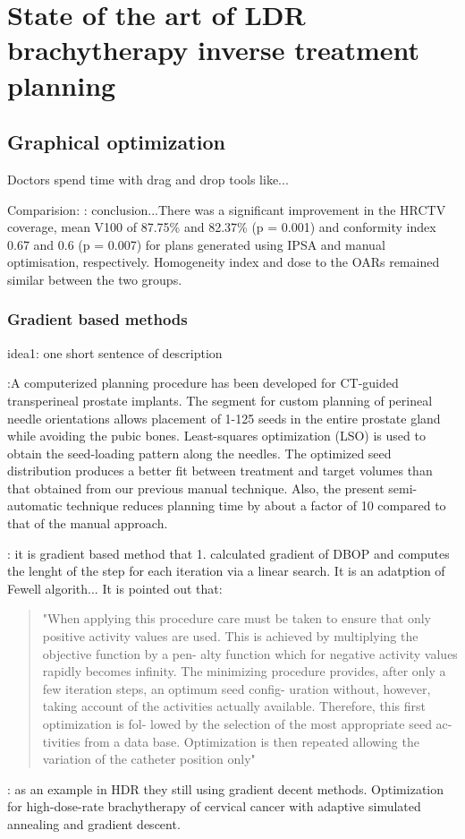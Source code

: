 \documentclass[12pt]{article}
\theoremstyle{definition}
\begin{document}
\section{State of the art of LDR brachytherapy inverse treatment planning}
\subsection{Graphical optimization}
Doctors spend time with drag and drop tools like...\par
Comparision: \cite{kannan2015comparison}: conclusion...There was a significant improvement in the HRCTV coverage, mean V100 of 87.75\% and 82.37\% (p = 0.001) and conformity index 0.67 and 0.6 (p = 0.007) for plans generated using IPSA and manual optimisation, respectively. Homogeneity index and dose to the OARs remained similar between the two groups.
\subsubsection{Gradient based methods}
idea1: one short sentence of description\par
\cite{roy1991ct}:A computerized planning procedure has been developed for CT-guided transperineal prostate implants. The segment for custom planning of perineal needle orientations allows placement of 1-125 seeds in the entire prostate gland while avoiding the pubic bones. Least-squares optimization (LSO) is used to obtain the seed-loading pattern along the needles. The optimized seed distribution produces a better fit between treatment and target volumes than that obtained from our previous manual technique. Also, the present semi-automatic technique reduces planning time by about a factor of 10 compared to that of the manual approach.\par
\cite{bauer1988computerized}: it is gradient based method that 1. calculated gradient of DBOP and computes the lenght of the step for each iteration via a linear search. It is an adatption of Fewell algorith... It is pointed out that:\par
\begin{quote}
"When applying this procedure care must be taken to ensure that only positive activity values are used. This is achieved by multiplying the objective function by a pen- alty function which for negative activity values rapidly becomes infinity. The minimizing procedure provides, after only a few iteration steps, an optimum seed config- uration without, however, taking account of the activities actually available. Therefore, this first optimization is fol- lowed by the selection of the most appropriate seed ac- tivities from a data base. Optimization is then repeated allowing the variation of the catheter position only"
\end{quote}
\cite{yao2014optimization}: as an example in HDR they still using gradient decent methods. Optimization for high-dose-rate brachytherapy of cervical cancer with adaptive simulated annealing and gradient descent.
\end{document}
